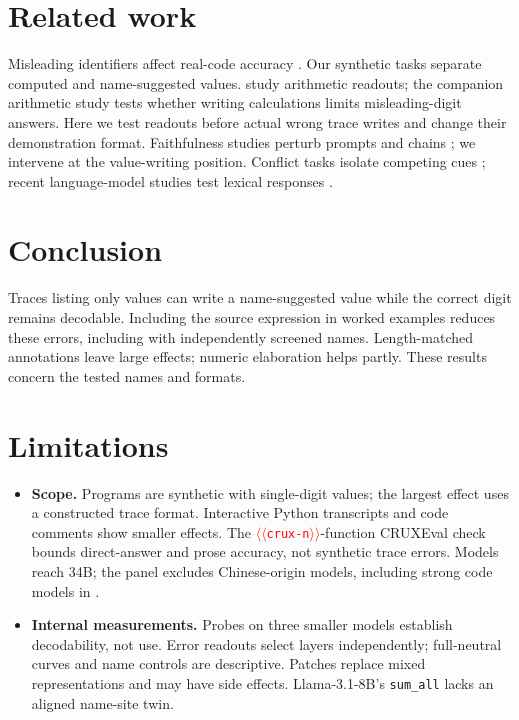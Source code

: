 \documentclass[11pt]{article}
\providecommand{\NUM}[1]{\textcolor{red}{$\langle\langle$\texttt{#1}$\rangle\rangle$}}
\begin{document}
\section{Related work}

Misleading identifiers affect real-code accuracy
\cite{le2025names,lam2025codecrash,le2026obfuscated,orvalho2025mutations,gao2023cream}.
Our synthetic tasks separate computed and name-suggested values.
\citet{kudo2026faithful} study arithmetic readouts; the companion arithmetic study
\cite{anon2026arith} tests whether writing calculations limits misleading-digit answers.
Here we test readouts before actual wrong trace writes and change their demonstration format.
Faithfulness studies perturb prompts and chains
\cite{turpin2023unfaithful,lanham2023measuring,chen2025reasoning}; we intervene at the
value-writing position. Conflict tasks isolate competing cues
\cite{stroop1935,geirhos2019texture}; recent language-model studies test lexical responses
\cite{wang2026stroop,hu2026conflict}.

\section{Conclusion}

Traces listing only values can write a name-suggested value while the correct digit remains decodable.
Including the source expression in worked examples reduces these errors, including with independently screened
names. Length-matched annotations leave large effects; numeric elaboration helps partly.
These results concern the tested names and formats.

\section*{Limitations}

\begin{itemize}
\item \textbf{Scope.} Programs are synthetic with single-digit values; the largest effect
uses a constructed trace format. Interactive Python transcripts and code comments show smaller effects. The
\NUM{crux-n}-function CRUXEval check bounds direct-answer and prose accuracy, not synthetic
trace errors. Models reach 34B; the panel excludes Chinese-origin models, including strong
code models in \citet{le2026obfuscated}.
\item \textbf{Internal measurements.} Probes on three smaller models establish decodability,
not use. Error readouts select layers independently; full-neutral curves and name controls
are descriptive. Patches replace mixed representations and may have side effects.
Llama-3.1-8B's \texttt{sum\_all} lacks an aligned name-site twin.
\end{itemize}
\end{document}
